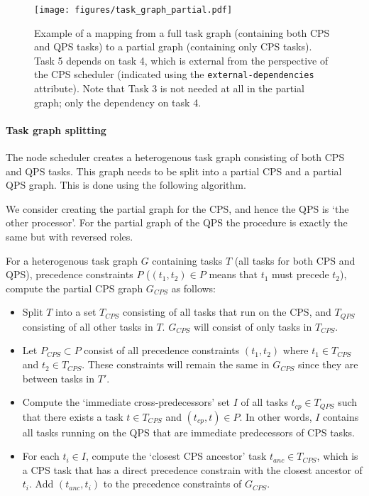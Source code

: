 \begin{figure}[ht]
    \centering
    \texttt{[image: figures/task\_graph\_partial.pdf]}
    \caption{
        Example of a mapping from a full task graph (containing both CPS and QPS tasks) to a partial graph (containing only CPS tasks).
        Task 5 depends on task 4, which is external from the perspective of the CPS scheduler (indicated using the \texttt{external-dependencies} attribute).
        Note that Task 3 is not needed at all in the partial graph; only the dependency on task 4.
    }
    \label{fig:app:task_graph_partial}
\end{figure}

\paragraph{Task graph splitting}
\label{app:task_graph_splitting}
The node scheduler creates a heterogenous task graph consisting of both CPS and QPS tasks.
This graph needs to be split into a partial CPS and a partial QPS graph.
This is done using the following algorithm.

We consider creating the partial graph for the CPS, and hence the QPS is `the other processor'.
For the partial graph of the QPS the procedure is exactly the same but with reversed roles.

For a heterogenous task graph $G$ containing tasks $T$ (all tasks for both CPS and QPS), precedence constraints $P$ ($(t_1, t_2) \in P$ means that $t_1$ must precede $t_2$), compute the partial CPS graph $G_{CPS}$ as follows:

\begin{itemize}
    \item Split $T$ into a set $T_{CPS}$ consisting of all tasks that run on the CPS, and $T_{QPS}$ consisting of all other tasks in $T$. $G_{CPS}$ will consist of only tasks in $T_{CPS}$.
    \item Let $P_{CPS} \subset P$ consist of all precedence constraints $(t_1, t_2)$ where $t_1 \in T_{CPS}$ and $t_2 \in T_{CPS}$.
    These constraints will remain the same in $G_{CPS}$ since they are between tasks in $T'$.
    \item Compute the `immediate cross-predecessors' set $I$ of all tasks $t_{cp} \in T_{QPS}$ such that there exists a task $t \in T_{CPS}$ and $(t_{cp}, t) \in P$.
    In other words, $I$ contains all tasks running on the QPS that are immediate predecessors of CPS tasks.
    \item For each $t_i \in I$, compute the `closest CPS ancestor' task $t_{anc} \in T_{CPS}$, which is a CPS task that has a direct precedence constrain with the closest ancestor of $t_i$.
    Add $(t_{anc}, t_i)$ to the precedence constraints of $G_{CPS}$.
\end{itemize}


